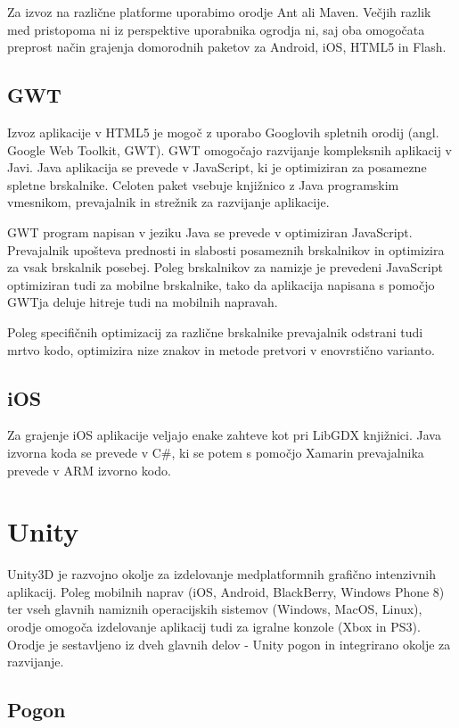 Za izvoz na različne platforme uporabimo orodje Ant ali Maven. Večjih razlik med pristopoma ni iz perspektive uporabnika ogrodja ni, saj oba omogočata preprost način grajenja domorodnih paketov za Android, iOS, HTML5 in Flash.

\subsection{GWT}

Izvoz aplikacije v HTML5 je mogoč z uporabo Googlovih spletnih orodij (angl. Google Web Toolkit, GWT). GWT omogočajo razvijanje kompleksnih aplikacij v Javi. Java aplikacija se prevede v JavaScript, ki je optimiziran za posamezne spletne brskalnike. Celoten paket vsebuje knjižnico z Java programskim vmesnikom, prevajalnik in strežnik za razvijanje aplikacije.

GWT program napisan v jeziku Java se prevede v optimiziran JavaScript. Prevajalnik upošteva prednosti in slabosti posameznih brskalnikov in optimizira za vsak brskalnik posebej. Poleg brskalnikov za namizje je prevedeni JavaScript optimiziran tudi za mobilne brskalnike, tako da aplikacija napisana s pomočjo GWTja deluje hitreje tudi na mobilnih napravah.

Poleg specifičnih optimizacij za različne brskalnike prevajalnik odstrani tudi mrtvo kodo, optimizira nize znakov in metode pretvori v enovrstično varianto.

\subsection{iOS}

Za grajenje iOS aplikacije veljajo enake zahteve kot pri LibGDX knjižnici. Java izvorna koda se prevede v C\#, ki se potem s pomočjo Xamarin prevajalnika prevede v ARM izvorno kodo. 

\section{Unity}

Unity3D \cite{unity} je razvojno okolje za izdelovanje medplatformnih grafično intenzivnih aplikacij. Poleg mobilnih naprav (iOS, Android, BlackBerry, Windows Phone 8) ter vseh glavnih namiznih operacijskih sistemov (Windows, MacOS, Linux), orodje omogoča izdelovanje aplikacij tudi za igralne konzole (Xbox in PS3). Orodje je sestavljeno iz dveh glavnih delov - Unity pogon in integrirano okolje za razvijanje.

\subsection{Pogon}

